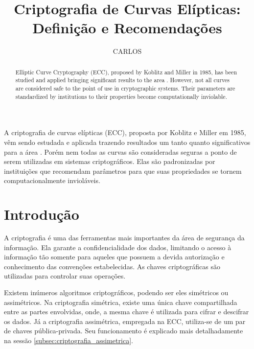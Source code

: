 \documentclass[12pt]{article}
\begin{document}
    \title{
        Criptografia de Curvas Elípticas: Definição e Recomendações
    }
    
    \author{CARLOS}

    \address{
        Universidade Estadual de Campinas (UNICAMP)\\Campinas - SP, Brasil\\2019
    }

    \maketitle

    \begin{abstract}
        Elliptic Curve Cryptography (ECC), proposed by Koblitz and Miller in 1985, has been studied and applied bringing significant results to the area \cite{vanstone2000state}. However, not all curves are considered safe to the point of use in cryptographic systems. Their parameters are standardized by institutions to their properties become computationally inviolable.
    \end{abstract}

    \begin{resumo}
        A criptografia de curvas elípticas (ECC), proposta por Koblitz e Miller em 1985, vêm sendo estudada e aplicada trazendo resultados um tanto quanto significativos para a área \cite{vanstone2000state}. Porém nem todas as curvas são consideradas seguras a ponto de serem utilizadas em sistemas criptográficos. Elas são padronizadas por instituições que recomendam parâmetros para que suas propriedades se tornem computacionalmente invioláveis.
    \end{resumo}
  
    \section{Introdução}
  
        A criptografia é uma das ferramentas mais importantes da área de segurança da informação. Ela garante a confidencialidade dos dados, limitando o acesso à informação tão somente para aqueles que possuem a devida autorização e conhecimento das convenções estabelecidas. As chaves criptográficas são utilizadas para controlar suas operações. 

        Existem inúmeros algoritmos criptográficos, podendo ser eles simétricos ou assimétricos. Na criptografia simétrica, existe uma única chave compartilhada entre as partes envolvidas, onde, a mesma chave é utilizada para cifrar e descifrar os dados. Já a criptografia assimétrica, empregada na ECC, utiliza-se de um par de chaves pública-privada. Seu funcionamento é explicado mais detalhadamente na sessão \ref{subsec:criptografia_assimetrica}.
\end{document}
